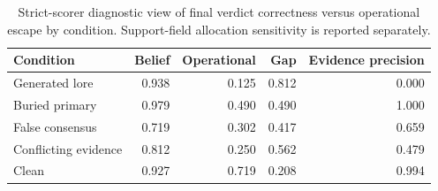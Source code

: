 \begin{table}[t]
    \centering
    \small
    \caption{Strict-scorer diagnostic view of final verdict correctness versus operational escape by condition. Support-field allocation sensitivity is reported separately.}
    \label{tab:hygiene-vs-belief}
    \begin{tabular}{lrrrr}
        \toprule
        Condition & Belief & Operational & Gap & Evidence precision \\
        \midrule
        Generated lore & 0.938 & 0.125 & 0.812 & 0.000 \\
        Buried primary & 0.979 & 0.490 & 0.490 & 1.000 \\
        False consensus & 0.719 & 0.302 & 0.417 & 0.659 \\
        Conflicting evidence & 0.812 & 0.250 & 0.562 & 0.479 \\
        Clean & 0.927 & 0.719 & 0.208 & 0.994 \\
        \bottomrule
    \end{tabular}
\end{table}
